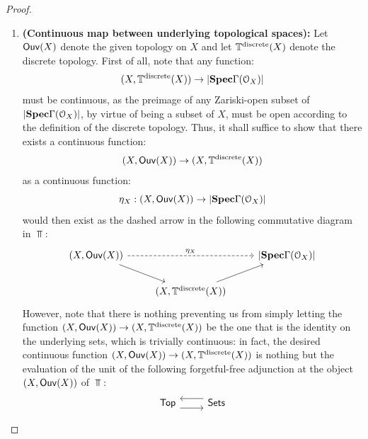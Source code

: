                     \begin{proof}
                        \noindent
                        \begin{enumerate}
                            \item \textbf{(Continuous map between underlying topological spaces):} Let $\Ouv(X)$ denote the given topology on $X$ and let $\T^{\discrete}(X)$ denote the discrete topology. First of all, note that any function:
                                $$(X, \T^{\discrete}(X)) \to |\Spec \Gamma(\calO_X)|$$
                            must be continuous, as the preimage of any Zariski-open subset of $|\Spec \Gamma(\calO_X)|$, by virtue of being a subset of $X$, must be open according to the definition of the discrete topology. Thus, it shall suffice to show that there exists a continuous function:
                                $$(X, \Ouv(X)) \to (X, \T^{\discrete}(X))$$
                            as a continuous function:
                                $$\eta_X: (X, \Ouv(X)) \to |\Spec \Gamma(\calO_X)|$$
                            would then exist as the dashed arrow in the following commutative diagram in $\Top$:
                                $$
                                    \begin{tikzcd}
                                    	{(X, \Ouv(X))} && {|\Spec \Gamma(\calO_X)|} \\
                                    	& {(X, \T^{\discrete}(X))}
                                    	\arrow[from=1-1, to=2-2]
                                    	\arrow[from=2-2, to=1-3]
                                    	\arrow["\eta_X", dashed, from=1-1, to=1-3]
                                    \end{tikzcd}
                                $$
                            However, note that there is nothing preventing us from simply letting the function $(X, \Ouv(X)) \to (X, \T^{\discrete}(X))$ be the one that is the identity on the underlying sets, which is trivially continuous: in fact, the desired continuous function $(X, \Ouv(X)) \to (X, \T^{\discrete}(X))$ is nothing but the evaluation of the unit of the following forgetful-free adjunction at the object $(X, \Ouv(X))$ of $\Top$:
                                $$
                                    \begin{tikzcd}
                                    	\Top & \Sets
                                    	\arrow[""{name=0, anchor=center, inner sep=0}, shift right=2, from=1-1, to=1-2]
                                    	\arrow[""{name=1, anchor=center, inner sep=0}, shift right=2, from=1-2, to=1-1]

\end{tikzcd}$$
\end{enumerate}
\end{proof}
